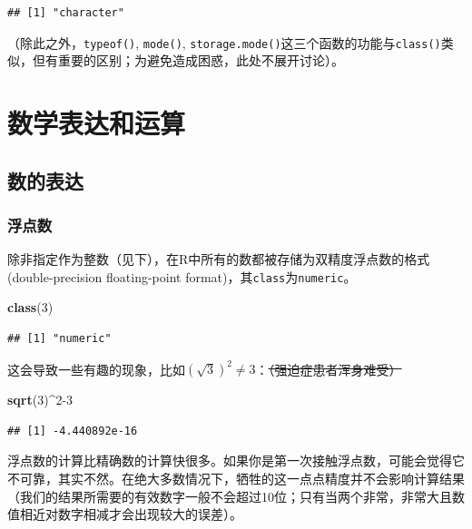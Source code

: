 \documentclass[]{book}
\newenvironment{Shaded}{\begin{snugshade}}{\end{snugshade}}
\newcommand{\DecValTok}[1]{\textcolor[rgb]{0.00,0.00,0.81}{#1}}
\newcommand{\KeywordTok}[1]{\textcolor[rgb]{0.13,0.29,0.53}{\textbf{#1}}}
\newcommand{\NormalTok}[1]{#1}
\newcommand{\OperatorTok}[1]{\textcolor[rgb]{0.81,0.36,0.00}{\textbf{#1}}}
\begin{document}
\begin{verbatim}
## [1] "character"
\end{verbatim}

（除此之外，\texttt{typeof()}, \texttt{mode()}, \texttt{storage.mode()}这三个函数的功能与\texttt{class()}类似，但有重要的区别；为避免造成困惑，此处不展开讨论）。

\section{数学表达和运算}

\subsection{数的表达}

\subsubsection{浮点数}

除非指定作为整数（见下），在R中所有的数都被存储为双精度浮点数的格式 (double-precision floating-point format)，其\texttt{class}为\texttt{numeric}。

\begin{Shaded}
\begin{Highlighting}[]
\KeywordTok{class}\NormalTok{(}\DecValTok{3}\NormalTok{)}
\end{Highlighting}
\end{Shaded}

\begin{verbatim}
## [1] "numeric"
\end{verbatim}

这会导致一些有趣的现象，比如\((\sqrt{3})^2 \neq 3\)：\sout{（强迫症患者浑身难受）}

\begin{Shaded}
\begin{Highlighting}[]
\KeywordTok{sqrt}\NormalTok{(}\DecValTok{3}\NormalTok{)}\OperatorTok{^}\DecValTok{2-3}
\end{Highlighting}
\end{Shaded}

\begin{verbatim}
## [1] -4.440892e-16
\end{verbatim}

浮点数的计算比精确数的计算快很多。如果你是第一次接触浮点数，可能会觉得它不可靠，其实不然。在绝大多数情况下，牺牲的这一点点精度并不会影响计算结果（我们的结果所需要的有效数字一般不会超过10位；只有当两个非常，非常大且数值相近对数字相减才会出现较大的误差）。
\end{document}
